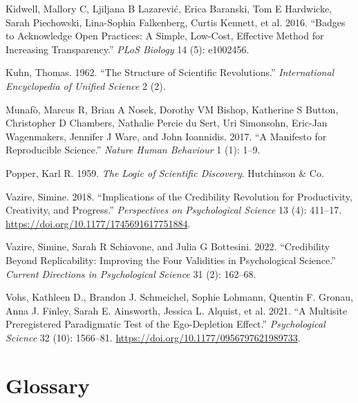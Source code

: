 \documentclass[
  letterpaper,
]{book}
\newlength{\cslhangindent}
\newenvironment{CSLReferences}[2] %
 {\begin{list}{}{%
  \setlength{\itemindent}{0pt}
  \setlength{\leftmargin}{0pt}
  \setlength{\parsep}{0pt}
  \ifodd #1
   \setlength{\leftmargin}{\cslhangindent}
   \setlength{\itemindent}{-1\cslhangindent}
  \fi
  \setlength{\itemsep}{#2\baselineskip}}}
 {\end{list}}
\begin{document}
\begin{CSLReferences}{1}{0}
Kidwell, Mallory C, Ljiljana B Lazarević, Erica Baranski, Tom E
Hardwicke, Sarah Piechowski, Lina-Sophia Falkenberg, Curtis Kennett, et
al. 2016. {``Badges to Acknowledge Open Practices: A Simple, Low-Cost,
Effective Method for Increasing Transparency.''} \emph{PLoS Biology} 14
(5): e1002456.

Kuhn, Thomas. 1962. {``The Structure of Scientific Revolutions.''}
\emph{International Encyclopedia of Unified Science} 2 (2).

Munafò, Marcus R, Brian A Nosek, Dorothy VM Bishop, Katherine S Button,
Christopher D Chambers, Nathalie Percie du Sert, Uri Simonsohn, Eric-Jan
Wagenmakers, Jennifer J Ware, and John Ioannidis. 2017. {``A Manifesto
for Reproducible Science.''} \emph{Nature Human Behaviour} 1 (1): 1--9.

Popper, Karl R. 1959. \emph{The Logic of Scientific Discovery}.
Hutchinson \& Co.

Vazire, Simine. 2018. {``Implications of the Credibility Revolution for
Productivity, Creativity, and Progress.''} \emph{Perspectives on
Psychological Science} 13 (4): 411--17.
\url{https://doi.org/10.1177/1745691617751884}.

Vazire, Simine, Sarah R Schiavone, and Julia G Bottesini. 2022.
{``Credibility Beyond Replicability: Improving the Four Validities in
Psychological Science.''} \emph{Current Directions in Psychological
Science} 31 (2): 162--68.

Vohs, Kathleen D., Brandon J. Schmeichel, Sophie Lohmann, Quentin F.
Gronau, Anna J. Finley, Sarah E. Ainsworth, Jessica L. Alquist, et al.
2021. {``A Multisite Preregistered Paradigmatic Test of the
Ego-Depletion Effect.''} \emph{Psychological Science} 32 (10): 1566--81.
\url{https://doi.org/10.1177/0956797621989733}.

\end{CSLReferences}


\chapter*{\texorpdfstring{{Glossary}}{Glossary}}\label{glossary}
\end{document}
